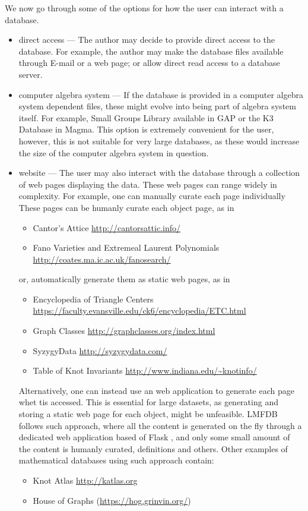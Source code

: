 \documentclass{article}
\begin{document}
We now go through some of the options for how the user can interact with a database.
\begin{itemize}
  \item direct access
    ---
    The author may decide to provide direct access to the database.
    For example, the author may make the database files available through E-mail or a web page; or
    allow direct read access to a database server.

  \item computer algebra system
    ---
    If the database is provided in a computer algebra system dependent files, these might evolve into being part of algebra system itself.
    For example, Small Groups Library available in GAP or the K3 Database in Magma. 
    This option is extremely convenient for the user, however, this is not suitable for very large databases, as these would increase the size of the computer algebra system in question.

  \item website
    ---
    The user may also interact with the database through a collection of web pages displaying the data.
    These web pages can range widely in complexity.
    For example, one can manually curate each page individually
    These pages can be humanly curate each object page, as in
    \begin{itemize}
      \item Cantor’s Attice \url{http://cantorsattic.info/}
      \item Fano Varieties and Extremeal Laurent Polynomials \url{http://coates.ma.ic.ac.uk/fanosearch/}
    \end{itemize}
    or, automatically generate them as static web pages, as in
    \begin{itemize}
      \item Encyclopedia of Triangle Centers \url{https://faculty.evansville.edu/ck6/encyclopedia/ETC.html}
      \item Graph Classes \url{http://graphclasses.org/index.html}
      \item SyzygyData \url{http://syzygydata.com/}
      \item Table of Knot Invariants \url{http://www.indiana.edu/~knotinfo/}
    \end{itemize}
    Alternatively, one can instead use an web application to generate each page whet tis accessed.
    This is essential for large datasets, as generating and storing a static web page for each object, might be unfeasible.
    LMFDB follows such approach, where all the content is generated on the fly through a dedicated web application based of Flask , and only some small amount of the content is humanly curated, definitions and others.
    Other examples of mathematical databases using such approach contain:
    \begin{itemize}
      \item Knot Atlas \url{http://katlas.org}
      \item House of Graphs (\url{https://hog.grinvin.org/})
    \end{itemize}
\end{itemize}
\end{document}

